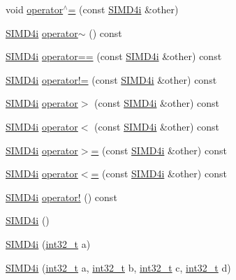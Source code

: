 \begin{DoxyCompactItemize}
\item 
void \hyperlink{class_s_i_m_d4i_a2115221d09eb9d6eb2d236ee17698e33}{operator$^\wedge$=} (const \hyperlink{class_s_i_m_d4i}{S\+I\+M\+D4i} \&other)
\item 
\hyperlink{class_s_i_m_d4i}{S\+I\+M\+D4i} \hyperlink{class_s_i_m_d4i_abcca6c92e88cad94e0496d57c66be46e}{operator$\sim$} () const 
\item 
\hyperlink{class_s_i_m_d4i}{S\+I\+M\+D4i} \hyperlink{class_s_i_m_d4i_aee9e483d69aa3a38dc893a2091895275}{operator==} (const \hyperlink{class_s_i_m_d4i}{S\+I\+M\+D4i} \&other) const 
\item 
\hyperlink{class_s_i_m_d4i}{S\+I\+M\+D4i} \hyperlink{class_s_i_m_d4i_ac96b9b64b3a615c7e12a96646608df05}{operator!=} (const \hyperlink{class_s_i_m_d4i}{S\+I\+M\+D4i} \&other) const 
\item 
\hyperlink{class_s_i_m_d4i}{S\+I\+M\+D4i} \hyperlink{class_s_i_m_d4i_aa11b40006a0b0fd3d2334df5288eb32e}{operator$>$} (const \hyperlink{class_s_i_m_d4i}{S\+I\+M\+D4i} \&other) const 
\item 
\hyperlink{class_s_i_m_d4i}{S\+I\+M\+D4i} \hyperlink{class_s_i_m_d4i_a03726659925ef53c4af036039788a8c3}{operator$<$} (const \hyperlink{class_s_i_m_d4i}{S\+I\+M\+D4i} \&other) const 
\item 
\hyperlink{class_s_i_m_d4i}{S\+I\+M\+D4i} \hyperlink{class_s_i_m_d4i_a7a4b9c0e001ac0f2b026332307e74cba}{operator$>$=} (const \hyperlink{class_s_i_m_d4i}{S\+I\+M\+D4i} \&other) const 
\item 
\hyperlink{class_s_i_m_d4i}{S\+I\+M\+D4i} \hyperlink{class_s_i_m_d4i_a47588286cec771000e1963da80eaca60}{operator$<$=} (const \hyperlink{class_s_i_m_d4i}{S\+I\+M\+D4i} \&other) const 
\item 
\hyperlink{class_s_i_m_d4i}{S\+I\+M\+D4i} \hyperlink{class_s_i_m_d4i_a86525b74b8a6a5f0423c516ae5febd64}{operator!} () const 
\item 
\hyperlink{class_s_i_m_d4i_aed962cf2d7cb1f3239fbaae17c54dfb3}{S\+I\+M\+D4i} ()
\item 
\hyperlink{class_s_i_m_d4i_a0811d87d5b92aa2c8b545ff4eed23667}{S\+I\+M\+D4i} (\hyperlink{simddefines_8h_ab1967d8591af1a4e48c37fd2b0f184d0}{int32\+\_\+t} a)
\item 
\hyperlink{class_s_i_m_d4i_a9ccdff6cad45fd026d7815a82fdbd3c0}{S\+I\+M\+D4i} (\hyperlink{simddefines_8h_ab1967d8591af1a4e48c37fd2b0f184d0}{int32\+\_\+t} a, \hyperlink{simddefines_8h_ab1967d8591af1a4e48c37fd2b0f184d0}{int32\+\_\+t} b, \hyperlink{simddefines_8h_ab1967d8591af1a4e48c37fd2b0f184d0}{int32\+\_\+t} c, \hyperlink{simddefines_8h_ab1967d8591af1a4e48c37fd2b0f184d0}{int32\+\_\+t} d)

\end{DoxyCompactItemize}
